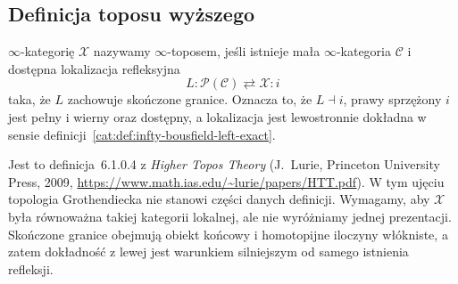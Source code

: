 \subsection{Definicja toposu wyższego}

\begin{definicja}\label{cat:def:infty-topos}
$\infty$-kategorię $\mathcal X$ nazywamy $\infty$-toposem, jeśli istnieje mała $\infty$-kategoria $\mathcal C$ i dostępna lokalizacja refleksyjna
\[
 L:\mathcal P(\mathcal C)\rightleftarrows\mathcal X:i
\]
taka, że $L$ zachowuje skończone granice. Oznacza to, że $L\dashv i$, prawy sprzężony $i$ jest pełny i wierny oraz dostępny, a lokalizacja jest lewostronnie dokładna w sensie definicji~\ref{cat:def:infty-bousfield-left-exact}.
\end{definicja}

Jest to definicja~6.1.0.4 z \emph{Higher Topos Theory} (J.~Lurie, Princeton University Press, 2009, \url{https://www.math.ias.edu/~lurie/papers/HTT.pdf}). W tym ujęciu topologia Grothendiecka nie stanowi części danych definicji. Wymagamy, aby $\mathcal X$ była równoważna takiej kategorii lokalnej, ale nie wyróżniamy jednej prezentacji. Skończone granice obejmują obiekt końcowy i homotopijne iloczyny włókniste, a zatem dokładność z lewej jest warunkiem silniejszym od samego istnienia refleksji.

